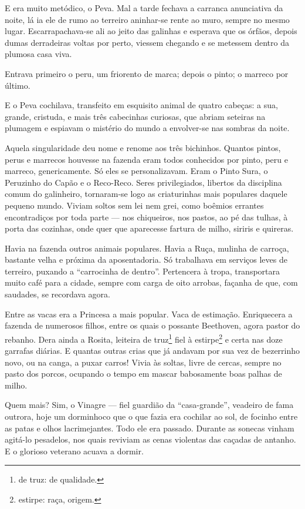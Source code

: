 E era muito metódico, o Peva. Mal a tarde fechava a carranca anunciativa
da noite, lá ia ele de rumo ao terreiro aninhar-se rente ao muro, sempre
no mesmo lugar. Escarrapachava-se ali ao jeito das galinhas e esperava
que os órfãos, depois dumas derradeiras voltas por perto, viessem
chegando e se metessem dentro da plumosa casa viva.

Entrava primeiro o peru, um friorento de marca; depois o pinto; o
marreco por último.

E o Peva cochilava, transfeito em esquisito animal de quatro cabeças: a
sua, grande, cristuda, e mais três cabecinhas curiosas, que abriam
seteiras na plumagem e espiavam o mistério do mundo a envolver-se nas
sombras da noite.

Aquela singularidade deu nome e renome aos três bichinhos. Quantos
pintos, perus e marrecos houvesse na fazenda eram todos conhecidos por
pinto, peru e marreco, genericamente. Só eles se personalizavam. Eram o
Pinto Sura, o Peruzinho do Capão e o Reco-Reco. Seres privilegiados,
libertos da disciplina comum do galinheiro, tornaram-se logo as
criaturinhas mais populares daquele pequeno mundo. Viviam soltos sem lei
nem grei, como boêmios errantes encontradiços por toda parte --- nos
chiqueiros, nos pastos, ao pé das tulhas, à porta das cozinhas, onde
quer que aparecesse fartura de milho, siriris e quireras.

Havia na fazenda outros animais populares. Havia a Ruça, mulinha de
carroça, bastante velha e próxima da aposentadoria. Só trabalhava em
serviços leves de terreiro, puxando a ``carrocinha de dentro''.
Pertencera à tropa, transportara muito café para a cidade, sempre com
carga de oito arrobas, façanha de que, com saudades, se recordava agora.

Entre as vacas era a Princesa a mais popular. Vaca de estimação.
Enriquecera a fazenda de numerosos filhos, entre os quais o possante
Beethoven, agora pastor do rebanho. Dera ainda a Rosita, leiteira de
truz\footnote{de truz: de qualidade.} fiel à estirpe\footnote{estirpe:
  raça, origem.} e certa nas doze garrafas diárias. E quantas outras
crias que já andavam por sua vez de bezerrinho novo, ou na canga, a
puxar carros! Vivia às soltas, livre de cercas, sempre no pasto dos
porcos, ocupando o tempo em mascar babosamente boas palhas de milho.

Quem mais? Sim, o Vinagre --- fiel guardião da ``casa-grande'', veadeiro
de fama outrora, hoje um dorminhoco que o que fazia era cochilar ao sol,
de focinho entre as patas e olhos lacrimejantes. Todo ele era passado.
Durante as sonecas vinham agitá-lo pesadelos, nos quais reviviam as
cenas violentas das caçadas de antanho. E o glorioso veterano acuava a
dormir.

